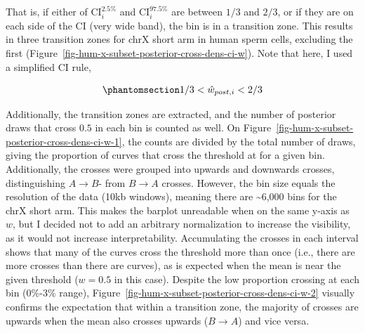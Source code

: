 \documentclass[
  10pt,
  a4paper,
  openany]{scrbook}
\begin{document}
That is, if either of \(\textrm{CI}^{2.5\%}_i\) and
\(\textrm{CI}^{97.5\%}_i\) are between \(1/3\) and \(2/3\), or if they
are on each side of the CI (very wide band), the bin is in a transition
zone. This results in three transition zones for chrX short arm in human
sperm cells, excluding the first
(Figure~\ref{fig-hum-x-subset-posterior-cross-dens-ci-w}). Note that
here, I used a simplified CI rule,

\begin{equation}\phantomsection\label{eq-ci-rule-simple}{
1/3 < \hat{w}_{post,i} < 2/3
}\end{equation}

Additionally, the transition zones are extracted, and the number of
posterior draws that cross \(0.5\) in each bin is counted as well. On
Figure~\ref{fig-hum-x-subset-posterior-cross-dens-ci-w-1}, the counts
are divided by the total number of draws, giving the proportion of
curves that cross the threshold at for a given bin. Additionally, the
crosses were grouped into upwards and downwards crosses, distinguishing
\(A\rightarrow B\)- from \(B\rightarrow A\) crosses. However, the bin
size equals the resolution of the data (10kb windows), meaning there are
\textasciitilde6,000 bins for the chrX short arm. This makes the barplot
unreadable when on the same y-axis as \(w\), but I decided not to add an
arbitrary normalization to increase the visibility, as it would not
increase interpretability. Accumulating the crosses in each interval
shows that many of the curves cross the threshold more than once (i.e.,
there are more crosses than there are curves), as is expected when the
mean is near the given threshold (\(w = 0.5\) in this case). Despite the
low proportion crossing at each bin (0\%-3\% range),
Figure~\ref{fig-hum-x-subset-posterior-cross-dens-ci-w-2} visually
confirms the expectation that within a transition zone, the majority of
crosses are upwards when the mean also crosses upwards
(\(B\rightarrow A\)) and vice versa.
\end{document}
